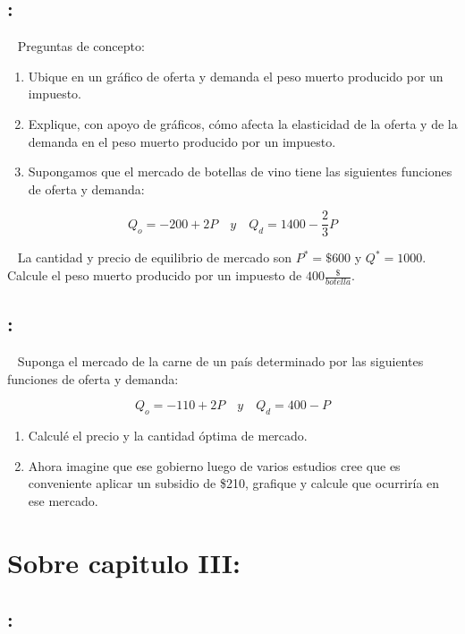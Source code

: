 \documentclass[
  letterpaper,
  DIV=11,
  numbers=noendperiod]{scrreport}
\begin{document}
\hypertarget{section-46}{%
\subsection{:}\label{section-46}}

~ Preguntas de concepto:

\begin{enumerate}
\def\labelenumi{\alph{enumi})}
\item
  Ubique en un gráfico de oferta y demanda el peso muerto producido por
  un impuesto.
\item
  Explique, con apoyo de gráficos, cómo afecta la elasticidad de la
  oferta y de la demanda en el peso muerto producido por un impuesto.
\item
  Supongamos que el mercado de botellas de vino tiene las siguientes
  funciones de oferta y demanda:
\end{enumerate}

\[Q_o =-200+2P \quad y\quad Q_d=1400-\frac{2}{3}P\]

~ La cantidad y precio de equilibrio de mercado son \(P^*=\$600\) y
\(Q^*=1000\). Calcule el peso muerto producido por un impuesto de
\(400\frac{\$}{botella}\).

\hypertarget{section-47}{%
\subsection{:}\label{section-47}}

~ Suponga el mercado de la carne de un país determinado por las
siguientes funciones de oferta y demanda:

\[Q_o =-110+2P \quad y\quad Q_d=400-P\]

\begin{enumerate}
\def\labelenumi{\alph{enumi})}
\item
  Calculé el precio y la cantidad óptima de mercado.
\item
  Ahora imagine que ese gobierno luego de varios estudios cree que es
  conveniente aplicar un subsidio de \$210, grafique y calcule que
  ocurriría en ese mercado.
\end{enumerate}

\hypertarget{sobre-capitulo-iii}{%
\section{Sobre capitulo III:}\label{sobre-capitulo-iii}}

\hypertarget{section-48}{%
\subsection{:}\label{section-48}}
\end{document}
